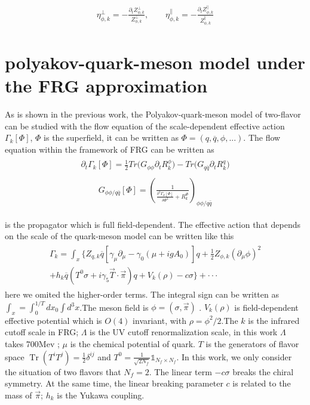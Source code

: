 \documentclass[%
reprint,
superscriptaddress,
showpacs,preprintnumbers,
 amsmath,amssymb,
 aps,
prd,
]{revtex4-1}
\newcommand{\Tr}{\ensuremath{\operatorname{Tr}}}
\begin{document}
\begin{align}
\eta_{\phi,k}^\bot=-\frac{\partial_tZ_{\phi,k}^\bot}{Z_{\phi,k}^\bot} ,\qquad \eta_{\phi,k}^\|=-\frac{\partial_tZ_{\phi,k}^\|}
{Z_{\phi,k}^\|}\label{eq:anodim}
\end{align}







\section{polyakov-quark-meson model under the FRG approximation}
As is shown in the previous work, the Polyakov-quark-meson model of two-flavor can be studied with the flow equation of the 
scale-dependent effective action 
$\Gamma_k[\Phi]$, $\Phi$ is the superfield, it can be written as
 $\Phi=(q,\overline{q},\phi,...)$.  The flow equation within the framework of FRG can be written as
\begin{align}\label{fqm}
\begin{split}
\partial_t\Gamma_k[\Phi]=\frac{1}{2}Tr\big(G_{\phi\phi}\partial_tR^{\phi}_{k}\big)-Tr\big(G_{q\bar{q}}\partial_tR^{q}_{k}\big)
\end{split}
\end{align}
\begin{align}\label{cqm}
\begin{split}
G_{\phi\phi/q\bar{q}}[\Phi]=\left( \frac{1}{\frac{\delta^2\Gamma_k[\Phi]}{\delta\Phi^2}+R^{\Phi}_{k}} \right)_{\phi\phi/
q\bar{q}}
\end{split}
\end{align}

is the propagator which is full field-dependent.
The effective action that depends on the scale of the quark-meson model can be written like this
\begin{align}
\begin{split}
\Gamma_k=\int_x\big\{Z_{q,k}\overline{q} [\gamma_\mu \partial_\mu -\gamma_0(\mu+igA_0) ]q+\frac{1}{2}Z_{\phi,k}
(\partial_\mu \phi)^2\\+h_k\overline{q}
(T^0\sigma+i\gamma_5\vec{T}\cdot \vec{\pi})q+V_k(\rho)-c\sigma \big\}+\cdot\cdot\cdot\label{eq:effact}
\end{split}
\end{align}
here we omited the higher-order terms. The integral sign can be written as $\int_x=\int_0^{1/T}dx_0\int d^3x$.The meson 
field is $\phi=\left(\sigma,\vec{\pi}
\right)$ . 
$V_k(\rho)$ is field-dependent effective potential which is $O(4)$ invariant, with $\rho=\phi^2/2$.The $k$ is the infrared 
cutoff scale in FRG; $\Lambda$ is the UV cutoff renormalization scale, in this work $\Lambda$ takes 700Mev ; $\mu$ is the chemical potential of quark. $T$ is the generators of flavor 
space $\Tr(T^{i}T^{j})=\frac{1}{2}\delta^{ij}$ and
 $T^{0}=\frac{1}{\sqrt{2N_{f}}}\mathbb{1}_{N_{f}\times N_{f}}$. In this work, we only consider the situation of two flavors that $N_f=2$. 
 The linear term $-c\sigma$ breaks the chiral symmetry. At 
 the same time, the linear breaking 
 parameter $c$ is related to the mass of $\vec{\pi}$; $h_k$ is the Yukawa coupling. \\
\end{document}
